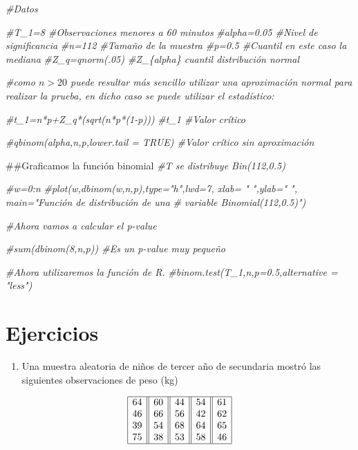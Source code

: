 \documentclass[a4paper,oneside,openany]{book}
\newenvironment{Shaded}{\begin{snugshade}}{\end{snugshade}}
\newcommand{\CommentTok}[1]{\textcolor[rgb]{0.56,0.35,0.01}{\textit{#1}}}
\newcommand{\NormalTok}[1]{#1}
\providecommand{\tightlist}{%
  \setlength{\itemsep}{0pt}\setlength{\parskip}{0pt}}
\begin{document}
\begin{Shaded}
\begin{Highlighting}[]
\CommentTok{#Datos}

\CommentTok{#T_1=8         #Observaciones menores a 60 minutos}
\CommentTok{#alpha=0.05    #Nivel de significancia}
\CommentTok{#n=112         #Tamaño de la muestra}
\CommentTok{#p=0.5         #Cuantil en este caso la mediana }
\CommentTok{#Z_q=qnorm(.05) #Z_\{alpha\}  cuantil distribución normal}

\CommentTok{#como $n>20$ puede resultar más sencillo utilizar una aproximación normal para realizar la prueba, en dicho caso se puede  utilizar el estadístico:}


\CommentTok{#t_1=n*p+Z_q*(sqrt(n*p*(1-p)))}
\CommentTok{#t_1     #Valor crítico}

\CommentTok{#qbinom(alpha,n,p,lower.tail = TRUE) #Valor crítico sin aproximación }

\NormalTok{##Graficamos la función binomial}
\CommentTok{#T se distribuye Bin(112,0.5)}

\CommentTok{#w=0:n}
\CommentTok{#plot(w,dbinom(w,n,p),type="h",lwd=7, xlab= " ",ylab=" ", main="Función de distribución de una }
 \CommentTok{#   variable Binomial(112,0.5)")}

\CommentTok{#Ahora vamos a calcular el p-value}
  
\CommentTok{#sum(dbinom(8,n,p))  #Es un p-value muy pequeño }

\CommentTok{#Ahora utilizaremos la función de R.}
\CommentTok{#binom.test(T_1,n,p=0.5,alternative = "less")}
\end{Highlighting}
\end{Shaded}

\section{Ejercicios}\label{ejercicios-1}

\begin{enumerate}
\def\labelenumi{\arabic{enumi}.}
\tightlist
\item
  Una muestra aleatoria de niños de tercer año de secundaria mostró las
  siguientes observaciones de peso (kg)
\end{enumerate}

\[
\begin{equation*}
\begin{array}{|c| |c| |c| |c| |c|} 
\hline
64& 60& 44& 54& 61\\
46& 66& 56& 42& 62\\
39& 54& 68& 64& 65\\
75& 38& 53& 58&46\\
\hline
\end{array}
\end{equation*}
\]
\end{document}
